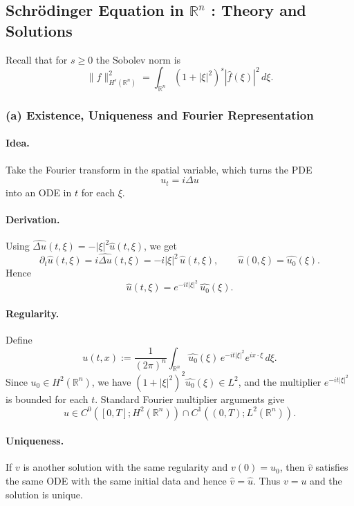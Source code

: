 \documentclass[12pt,a4paper]{article}
\theoremstyle{plain}
\theoremstyle{definition}
\theoremstyle{remark}
\theoremstyle{remark}
\begin{document}
\subsection*{Schrödinger Equation in $\mathbb{R}^n$ : Theory and Solutions}

Recall that for $s\ge 0$ the Sobolev norm is
\[
\|f\|_{H^s(\mathbb{R}^n)}^2
= \int_{\mathbb{R}^n} (1+|\xi|^2)^s |\widehat{f}(\xi)|^2\,d\xi.
\]

\subsubsection*{(a) \; Existence, Uniqueness and Fourier Representation}

\paragraph{\textbf{Idea.}}
Take the Fourier transform in the spatial variable, which turns the PDE
\[
u_t = i\Delta u
\]
into an ODE in $t$ for each $\xi$.

\paragraph{\textbf{Derivation.}}
Using $\widehat{\Delta u}(t,\xi) = -|\xi|^2\widehat{u}(t,\xi)$, we get
\[
\partial_t \widehat{u}(t,\xi) = i\widehat{\Delta u}(t,\xi)
= -i|\xi|^2\,\widehat{u}(t,\xi), \qquad
\widehat{u}(0,\xi) = \widehat{u_0}(\xi).
\]
Hence
\[
\widehat{u}(t,\xi)
= e^{-it|\xi|^2}\,\widehat{u_0}(\xi).
\]

\paragraph{\textbf{Regularity.}}
Define
\[
u(t,x)
:= \frac{1}{(2\pi)^n} \int_{\mathbb{R}^n}
\widehat{u_0}(\xi)\,e^{-it|\xi|^2} e^{ix\cdot\xi}\,d\xi.
\]
Since $u_0\in H^2(\mathbb{R}^n)$, we have
$(1+|\xi|^2)^2\widehat{u_0}(\xi)\in L^2$, and the multiplier
$e^{-it|\xi|^2}$ is bounded for each $t$. Standard Fourier multiplier
arguments give
\[
u \in C^0([0,T];H^2(\mathbb{R}^n))
\cap C^1((0,T);L^2(\mathbb{R}^n)).
\]

\paragraph{\textbf{Uniqueness.}}
If $v$ is another solution with the same regularity and $v(0)=u_0$, then
$\widehat{v}$ satisfies the same ODE with the same initial data and
hence $\widehat{v}=\widehat{u}$. Thus $v=u$ and the solution is unique.
\end{document}
